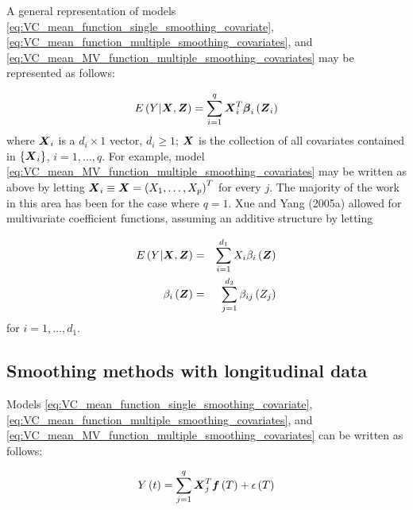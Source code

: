 \documentclass[12pt]{article}
\newcommand{\bfbeta}{\mbox{\boldmath $\beta$}}
\newcommand{\bff}{\mbox{\boldmath $f$}}
\newcommand{\bfX}{\mbox{\boldmath $X$}}
\newcommand{\bfZ}{\mbox{\boldmath $Z$}}
\begin{document}
A general representation of models \ref{eq:VC_mean_function_single_smoothing_covariate}, \ref{eq:VC_mean_function_multiple_smoothing_covariates}, and \ref{eq:VC_mean_MV_function_multiple_smoothing_covariates} may be represented as follows:

\begin{equation} \label{eq:general_VC_model}
E\left(Y \vert \bfX, \bfZ\right) = \sum_{i=1}^q \bfX_i^T \bfbeta_i\left(\bfZ_i\right)
\end{equation}
\noindent
where $\bfX_i$ is a $d_i \times 1$ vector, $d_i \ge 1$; $\bfX$ is the collection of all covariates contained in $\lbrace \bfX_i \rbrace$, $i=1,\dots,q$. For example, model \ref{eq:VC_mean_MV_function_multiple_smoothing_covariates} may be written as above by letting $\bfX_i \equiv \bfX = \left(X_1,\dots, X_p\right)^T$ for every $j$. The majority of the work in this area has been for the case where $q=1$.  Xue and Yang (2005a) allowed for multivariate coefficient functions, assuming an additive structure by letting

\begin{eqnarray} 
E\left(Y \vert \bfX, \bfZ\right) &=& \sum_{i=1}^{d_1} X_i \beta_i\left(\bfZ\right) \label{eq:xue_VC_model}\\
\beta_i\left(\bfZ\right) &=& \sum_{j=1}^{d_2} \beta_{ij}\left(Z_j\right) \nonumber
\end{eqnarray}
\noindent
for $i=1,\dots, d_1$.

 

















\subsection{Smoothing methods with longitudinal data}

Models \ref{eq:VC_mean_function_single_smoothing_covariate}, \ref{eq:VC_mean_function_multiple_smoothing_covariates}, and \ref{eq:VC_mean_MV_function_multiple_smoothing_covariates} can be written as follows:

\begin{equation} \label{eq:functional_VC_model}
Y\left(t\right) = \sum_{j=1}^q \bfX_j^T \bff \left(T\right) + \epsilon\left(T\right)
\end{equation}
\end{document}
